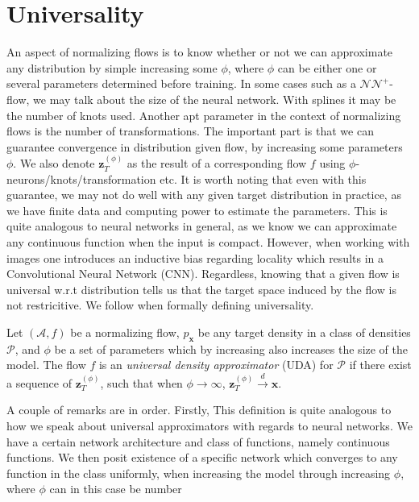 \section{Universality}
An aspect of normalizing flows is to know whether or not we can approximate any
distribution by simple increasing some \(\phi\), where \(\phi\) can be either
one or several parameters determined before training. In some cases such as a \(\mathcal{NN}^{+}\)-flow,
we may talk about the size of the neural network.
With splines it may be the number of knots used. Another
apt parameter in the context of normalizing flows is the number of transformations. 
The important part is that we can guarantee convergence in
distribution given flow, by increasing some parameters \(\phi\). We also denote
\(\bm z_T^{(\phi)}\) as the result of a corresponding flow \(f\) using \(\phi\)-neurons/knots/transformation etc.
It is worth noting that even with this guarantee,
we may not do well with any given target distribution in practice, as we have finite data 
and computing power to estimate the parameters. This is quite analogous to neural networks in general,
as we know we can approximate any continuous function when the input is compact. However,
when working with images one introduces an inductive bias regarding locality
which results in a Convolutional Neural Network (CNN). Regardless, knowing 
that a given flow is universal w.r.t distribution tells us that the target space
induced by the flow is not restricitive. We follow \cite{naf} when formally defining universality.
\begin{definition} 
    Let \((\mathcal{A}, f)\) be a normalizing flow, \(p_{\bm x}\) be any target density in a class of densities \(\mathscr{P}\),
    and \(\phi\) be a set of parameters which by increasing also increases the size of the model.
    The flow \(f\) is an \emph{universal density approximator} (UDA) for \(\mathscr{P}\) if there exist
    a sequence of \(\bm z_T^{(\phi)}\), such that when \(\phi \rightarrow \infty\),
    \(\bm z_T^{(\phi)} \xrightarrow{d} \bm x\).
\end{definition}
A couple of remarks are in order. Firstly, This definition is quite analogous to how we speak about universal approximators with regards to neural networks. We have a certain
network architecture and class of functions, namely continuous functions. We then posit existence of a specific network which converges
to any function in the class uniformly, when increasing the model through increasing \(\phi\), where \(\phi\) can in this case be number
